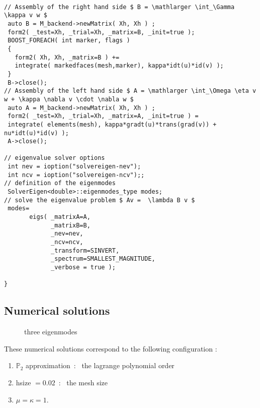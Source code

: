 \begin{lstlisting}

// Assembly of the right hand side $ B = \mathlarger \int_\Gamma \kappa v w $
 auto B = M_backend->newMatrix( Xh, Xh ) ;
 form2( _test=Xh, _trial=Xh, _matrix=B, _init=true );
 BOOST_FOREACH( int marker, flags )
 {
   form2( Xh, Xh, _matrix=B ) +=
   integrate( markedfaces(mesh,marker), kappa*idt(u)*id(v) );
 }
 B->close();
// Assembly of the left hand side $ A = \mathlarger \int_\Omega \eta v w + \kappa \nabla v \cdot \nabla w $
 auto A = M_backend->newMatrix( Xh, Xh ) ;
 form2( _test=Xh, _trial=Xh, _matrix=A, _init=true ) =
 integrate( elements(mesh), kappa*gradt(u)*trans(grad(v)) + nu*idt(u)*id(v) );
 A->close();

// eigenvalue solver options
 int nev = ioption("solvereigen-nev");
 int ncv = ioption("solvereigen-ncv");;
// definition of the eigenmodes
 SolverEigen<double>::eigenmodes_type modes;
// solve the eigenvalue problem $ Av =  \lambda B v $
 modes=
       eigs( _matrixA=A,
             _matrixB=B,
             _nev=nev,
             _ncv=ncv,
             _transform=SINVERT,
             _spectrum=SMALLEST_MAGNITUDE,
             _verbose = true );

}

\end{lstlisting}

\subsection{Numerical solutions}
\label{sec:numerical-solutions-1}
\vspace{-17pt}
\begin{figure}[htbp]
  \centering
  \hspace{0.3cm}
  \hspace{0.3cm}
  \caption{three eigenmodes}
\label{fig:eigenvalues}
\end{figure}
These numerical solutions correspond to the following configuration :
\begin{enumerate}
\item $\mathbb P_2$ approximation~:~ the lagrange polynomial order
\item hsize $= 0.02$~:~ the mesh size
\item $\mu = \kappa = 1.$
\end{enumerate}
